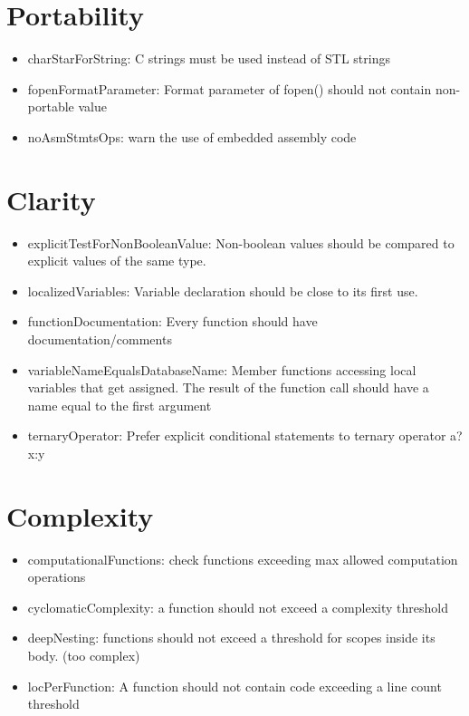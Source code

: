 \section{Portability}
\begin{itemize}
\item charStarForString: C strings must be used instead of STL strings
\item fopenFormatParameter: Format parameter of fopen() should not contain non-portable value
\item noAsmStmtsOps: warn the use of embedded assembly code
\end{itemize}

\section{Clarity}
\begin{itemize}
\item explicitTestForNonBooleanValue: Non-boolean values should be compared to explicit values of the same type. 
\item localizedVariables: Variable declaration should be close to its first use.
\item functionDocumentation: Every function should have documentation/comments
\item variableNameEqualsDatabaseName: Member functions accessing local variables that get assigned. The result of the function call should have a name equal to the first argument
\item ternaryOperator: Prefer explicit conditional statements to ternary operator a?x:y
\end{itemize}

\section{Complexity}
\begin{itemize}
\item computationalFunctions: check functions exceeding max allowed computation operations
\item cyclomaticComplexity: a function should not exceed a complexity threshold
\item deepNesting: functions should not exceed a threshold for scopes inside its body. (too complex)
\item locPerFunction: A function should not contain code exceeding a line count threshold
\end{itemize}

